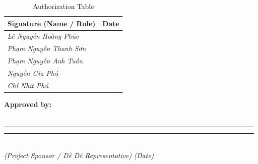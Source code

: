 \noindent
\begin{table}[H]
\begin{tabularx}{\textwidth}{|Y|p{5cm}|} %
\hline
{} \centering \textbf{Signature (Name / Role)} & \centering\arraybackslash \textbf{Date} \\ \hline
\rule{0pt}{40pt} \textit{Lê Nguyễn Hoàng Phúc} & \\ \hline
\rule{0pt}{40pt} \textit{Phạm Nguyễn Thanh Sơn} & \\ \hline
\rule{0pt}{40pt} \textit{Phạm Nguyễn Anh Tuấn} & \\ \hline
\rule{0pt}{40pt} \textit{Nguyễn Gia Phú} & \\ \hline
\rule{0pt}{40pt} \textit{Chí Nhịt Phú} & \\ \hline
\end{tabularx}
\caption{Authorization Table}
\end{table}

\vspace{1cm}
\noindent
\textbf{Approved by:} \\
\vspace{0.5cm} \\
\rule{6cm}{0.5pt} \hfill \rule{4cm}{0.5pt} \\
\textit{(Project Sponsor / Dề Dê Representative)} \hfill \textit{(Date)}